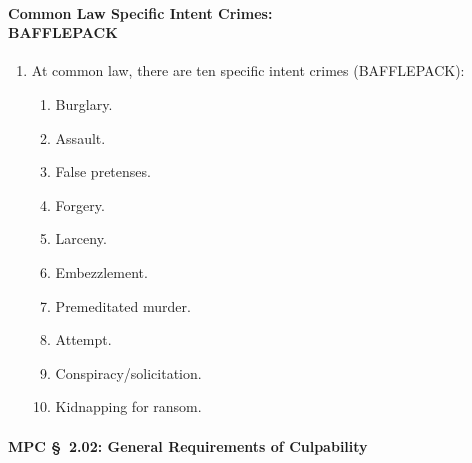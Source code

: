 \paragraph{Common Law Specific Intent Crimes:\\BAFFLEPACK}

\begin{enumerate}
    \item At common law, there are ten specific intent crimes (BAFFLEPACK):
    \begin{enumerate}
        \item Burglary.
        \item Assault.
        \item False pretenses.
        \item Forgery.
        \item Larceny.
        \item Embezzlement.
        \item Premeditated murder.
        \item Attempt.
        \item Conspiracy/solicitation.
        \item Kidnapping for ransom.
    \end{enumerate}
\end{enumerate}

\paragraph{MPC \S\ 2.02: General Requirements of Culpability}

